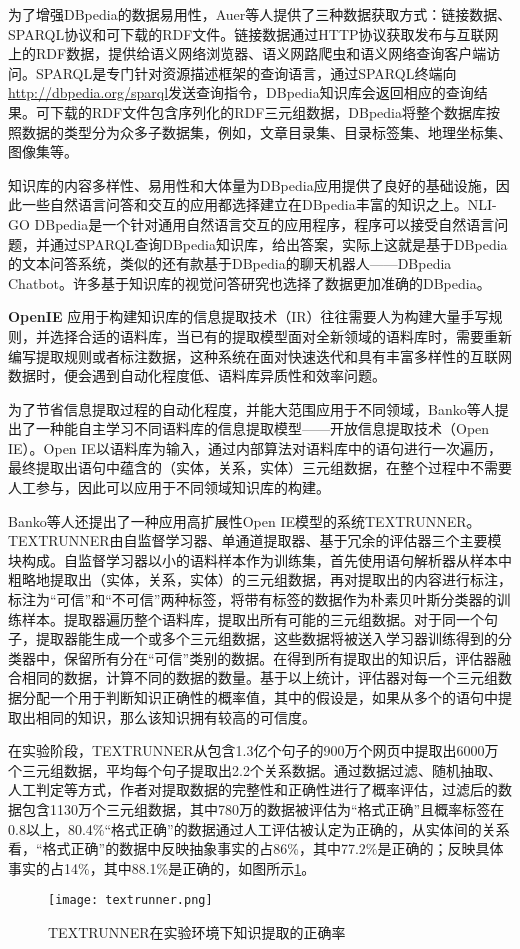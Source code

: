 为了增强DBpedia的数据易用性，Auer等人提供了三种数据获取方式：链接数据、SPARQL协议和可下载的RDF文件。链接数据通过HTTP协议获取发布与互联网上的RDF数据，提供给语义网络浏览器、语义网路爬虫和语义网络查询客户端访问。SPARQL是专门针对资源描述框架的查询语言，通过SPARQL终端向\url{http://dbpedia.org/sparql}发送查询指令，DBpedia知识库会返回相应的查询结果。可下载的RDF文件包含序列化的RDF三元组数据，DBpedia将整个数据库按照数据的类型分为众多子数据集，例如，文章目录集、目录标签集、地理坐标集、图像集等。

知识库的内容多样性、易用性和大体量为DBpedia应用提供了良好的基础设施，因此一些自然语言问答和交互的应用都选择建立在DBpedia丰富的知识之上。NLI-GO DBpedia是一个针对通用自然语言交互的应用程序，程序可以接受自然语言问题，并通过SPARQL查询DBpedia知识库，给出答案，实际上这就是基于DBpedia的文本问答系统，类似的还有款基于DBpedia的聊天机器人——DBpedia Chatbot。许多基于知识库的视觉问答研究也选择了数据更加准确的DBpedia。

\textbf{OpenIE}
应用于构建知识库的信息提取技术（IR）往往需要人为构建大量手写规则，并选择合适的语料库，当已有的提取模型面对全新领域的语料库时，需要重新编写提取规则或者标注数据，这种系统在面对快速迭代和具有丰富多样性的互联网数据时，便会遇到自动化程度低、语料库异质性和效率问题。

为了节省信息提取过程的自动化程度，并能大范围应用于不同领域，Banko等人提出了一种能自主学习不同语料库的信息提取模型——开放信息提取技术（Open IE）。Open IE以语料库为输入，通过内部算法对语料库中的语句进行一次遍历，最终提取出语句中蕴含的（实体，关系，实体）三元组数据，在整个过程中不需要人工参与，因此可以应用于不同领域知识库的构建。

Banko等人还提出了一种应用高扩展性Open IE模型的系统TEXTRUNNER。TEXTRUNNER由自监督学习器、单通道提取器、基于冗余的评估器三个主要模块构成。自监督学习器以小的语料样本作为训练集，首先使用语句解析器从样本中粗略地提取出（实体，关系，实体）的三元组数据，再对提取出的内容进行标注，标注为“可信”和“不可信”两种标签，将带有标签的数据作为朴素贝叶斯分类器的训练样本。提取器遍历整个语料库，提取出所有可能的三元组数据。对于同一个句子，提取器能生成一个或多个三元组数据，这些数据将被送入学习器训练得到的分类器中，保留所有分在“可信”类别的数据。在得到所有提取出的知识后，评估器融合相同的数据，计算不同的数据的数量。基于以上统计，评估器对每一个三元组数据分配一个用于判断知识正确性的概率值，其中的假设是，如果从多个的语句中提取出相同的知识，那么该知识拥有较高的可信度。

在实验阶段，TEXTRUNNER从包含1.3亿个句子的900万个网页中提取出6000万个三元组数据，平均每个句子提取出2.2个关系数据。通过数据过滤、随机抽取、人工判定等方式，作者对提取数据的完整性和正确性进行了概率评估，过滤后的数据包含1130万个三元组数据，其中780万的数据被评估为“格式正确”且概率标签在0.8以上，80.4\%“格式正确”的数据通过人工评估被认定为正确的，从实体间的关系看，“格式正确”的数据中反映抽象事实的占86\%，其中77.2\%是正确的；反映具体事实的占14\%，其中88.1\%是正确的，如图所示\ref{textrunner}。
\begin{figure}[H]
	\centering
	\texttt{[image: textrunner.png]}
	\caption{TEXTRUNNER在实验环境下知识提取的正确率}
	\label{textrunner}
\end{figure}

